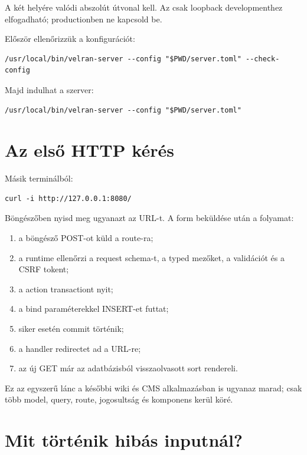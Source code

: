 A két  helyére valódi abszolút útvonal kell. Az  csak loopback developmenthez elfogadható; productionben ne kapcsold be.

Először ellenőrizzük a konfigurációt:

\begin{lstlisting}
/usr/local/bin/velran-server --config "$PWD/server.toml" --check-config
\end{lstlisting}

Majd indulhat a szerver:

\begin{lstlisting}
/usr/local/bin/velran-server --config "$PWD/server.toml"
\end{lstlisting}

\section{Az első HTTP kérés}

Másik terminálból:

\begin{lstlisting}
curl -i http://127.0.0.1:8080/
\end{lstlisting}

Böngészőben nyisd meg ugyanazt az URL-t. A form beküldése után a folyamat:

\begin{enumerate}
  \item a böngésző POST-ot küld a  route-ra;
  \item a runtime ellenőrzi a request schema-t, a typed mezőket, a validációt és a CSRF tokent;
  \item a  action transactiont nyit;
  \item a  bind paraméterekkel INSERT-et futtat;
  \item siker esetén commit történik;
  \item a handler redirectet ad a \code{/} URL-re;
  \item az új GET már az adatbázisból visszaolvasott sort rendereli.
\end{enumerate}

Ez az egyszerű lánc a későbbi wiki és CMS alkalmazásban is ugyanaz marad; csak több model, query, route, jogosultság és komponens kerül köré.

\section{Mit történik hibás inputnál?}

